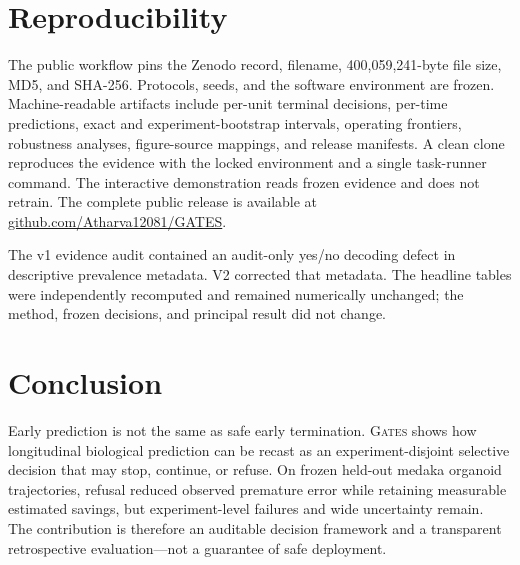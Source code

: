 \documentclass[11pt,twocolumn]{article}
\newcommand{\method}{\textsc{Gates}\xspace}
\begin{document}
\section{Reproducibility}

The public workflow pins the Zenodo record, filename, 400,059,241-byte file size, MD5, and SHA-256.
Protocols, seeds, and the software environment are frozen. Machine-readable artifacts include
per-unit terminal decisions, per-time predictions, exact and experiment-bootstrap intervals,
operating frontiers, robustness analyses, figure-source mappings, and release manifests. A clean
clone reproduces the evidence with the locked environment and a single task-runner command. The
interactive demonstration reads frozen evidence and does not retrain. The complete public release
is available at \href{https://github.com/Atharva12081/GATES}{github.com/Atharva12081/GATES}.

The v1 evidence audit contained an audit-only yes/no decoding defect in descriptive prevalence
metadata. V2 corrected that metadata. The headline tables were independently recomputed and
remained numerically unchanged; the method, frozen decisions, and principal result did not change.

\section{Conclusion}

Early prediction is not the same as safe early termination. \method shows how longitudinal
biological prediction can be recast as an experiment-disjoint selective decision that may stop,
continue, or refuse. On frozen held-out medaka organoid trajectories, refusal reduced observed
premature error while retaining measurable estimated savings, but experiment-level failures and
wide uncertainty remain. The contribution is therefore an auditable decision framework and a
transparent retrospective evaluation---not a guarantee of safe deployment.
\end{document}

